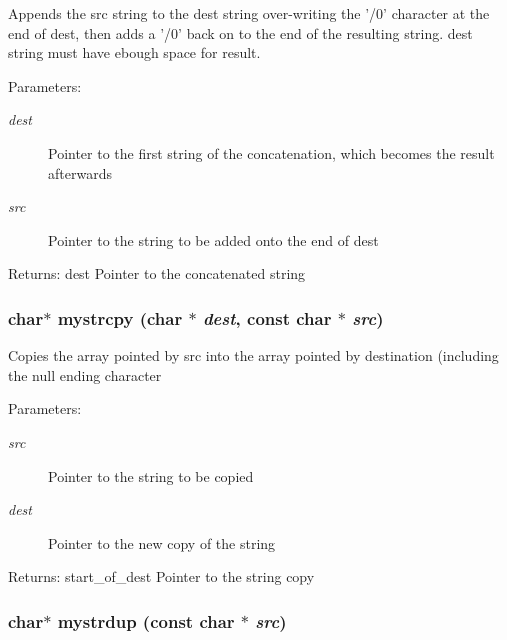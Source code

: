 Appends the src string to the dest string over-writing the '/0' character at the end of dest, then adds a '/0' back on to the end of the resulting string. dest string must have ebough space for result. \begin{Desc}
\item[Parameters:]
\begin{description}
\item[{\em dest}]Pointer to the first string of the concatenation, which becomes the result afterwards \item[{\em src}]Pointer to the string to be added onto the end of dest \end{description}
\end{Desc}
\begin{Desc}
\item[Returns:]dest Pointer to the concatenated string \end{Desc}
\subsubsection{\setlength{\rightskip}{0pt plus 5cm}char$\ast$ mystrcpy (char $\ast$ {\em dest}, const char $\ast$ {\em src})}\label{mystring_8c_515b2c58f31e99a4564e463ffbf73e2f}


Copies the array pointed by src into the array pointed by destination (including the null ending character \begin{Desc}
\item[Parameters:]
\begin{description}
\item[{\em src}]Pointer to the string to be copied \item[{\em dest}]Pointer to the new copy of the string \end{description}
\end{Desc}
\begin{Desc}
\item[Returns:]start\_\-of\_\-dest Pointer to the string copy \end{Desc}
\subsubsection{\setlength{\rightskip}{0pt plus 5cm}char$\ast$ mystrdup (const char $\ast$ {\em src})}\label{mystring_8c_148a52c665d88f52fb4995338a319d3c}


